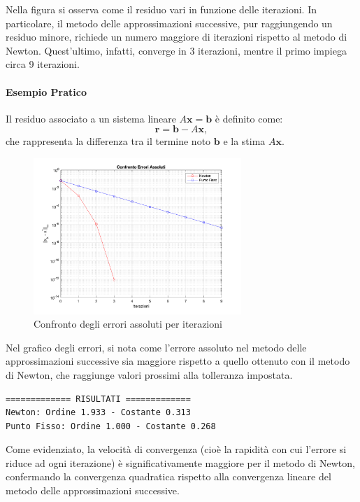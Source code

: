\documentclass[11pt]{article}
\begin{document}
Nella figura si osserva come il residuo vari in funzione delle iterazioni. In particolare, il metodo delle approssimazioni successive, pur raggiungendo un residuo minore, richiede un numero maggiore di iterazioni rispetto al metodo di Newton. Quest'ultimo, infatti, converge in 3 iterazioni, mentre il primo impiega circa 9 iterazioni.

\begin{mdframed}[linecolor=blue, linewidth=1pt, roundcorner=10pt]
\paragraph{Esempio Pratico}
Il residuo associato a un sistema lineare \(A\mathbf{x} = \mathbf{b}\) è definito come:
\[
\mathbf{r} = \mathbf{b} - A\mathbf{x},
\]
che rappresenta la differenza tra il termine noto \(\mathbf{b}\) e la stima \(A\mathbf{x}\).
\end{mdframed}

\begin{figure}[H]
  \centering
  \includegraphics[width=0.7\textwidth]{images/figure2.png} 
  \caption{Confronto degli errori assoluti per iterazioni}
  \label{fig:errore}
\end{figure}
Nel grafico degli errori, si nota come l'errore assoluto nel metodo delle approssimazioni successive sia maggiore rispetto a quello ottenuto con il metodo di Newton, che raggiunge valori prossimi alla tolleranza impostata.

\begin{lstlisting}[style=console]
============= RISULTATI =============
Newton: Ordine 1.933 - Costante 0.313
Punto Fisso: Ordine 1.000 - Costante 0.268	
\end{lstlisting}
Come evidenziato, la velocità di convergenza (cioè la rapidità con cui l'errore si riduce ad ogni iterazione) è significativamente maggiore per il metodo di Newton, confermando la convergenza quadratica rispetto alla convergenza lineare del metodo delle approssimazioni successive.
\end{document}
